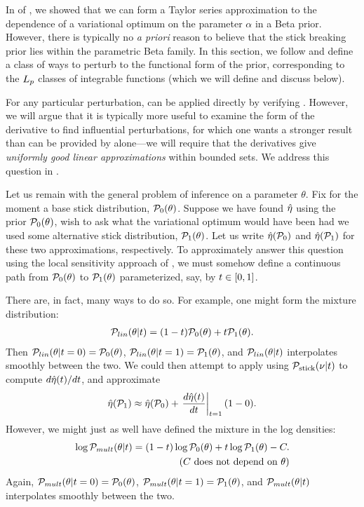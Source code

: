 In  of , we showed that
we can form a Taylor series approximation to the dependence of a variational
optimum on the parameter $\alpha$ in a Beta prior. However, there is typically
no {\em a priori} reason to believe that the stick breaking prior lies within
the parametric Beta family.  In this section, we follow
\citet{gustafson:1996:local} and define a class of ways to perturb to the
functional form of the prior, corresponding to the ${L_{p}}$ classes of
integrable functions (which we will define and discuss below).

For any particular perturbation,  can be applied directly by
verifying .  However, we will argue that it is
typically more useful to examine the form of the derivative to find influential
perturbations, for which one wants a stronger result than can be provided
by  alone---we will require that the derivatives give
{\em uniformly good linear approximations} within bounded sets.
We address this question in .

Let us remain with the general problem of inference on a parameter $\theta$.
Fix for the moment a base stick distribution, $\mathcal{P}_{0}(\theta)$.  Suppose we have
found $\hat\eta$ using the prior $\mathcal{P}_{0}(\theta)$, wish to ask what the variational
optimum would have been had we used some alternative stick distribution,
$\mathcal{P}_{1}(\theta)$.  Let us write $\hat\eta(\mathcal{P}_{0})$ and $\hat\eta(\mathcal{P}_{1})$ for these
two approximations, respectively.  To approximately answer this question using
the local sensitivity approach of , we must somehow
define a continuous path from $\mathcal{P}_{0}(\theta)$ to $\mathcal{P}_{1}(\theta)$ parameterized,
say, by $t \in [0, 1]$.

There are, in fact, many ways to do so.  For example, one might form the mixture
distribution:
%
\begin{align*}
%
\p_{lin}(\theta \vert \t) =
    (1- \t) \pbase(\theta) + \t \palt(\theta).
%
\end{align*}
%
Then $\mathcal{P}_{lin}(\theta \vert t=0) = \mathcal{P}_{0}(\theta)$, $\mathcal{P}_{lin}(\theta \vert t=1) =
\mathcal{P}_{1}(\theta)$, and $\mathcal{P}_{lin}(\theta \vert t)$ interpolates smoothly between the
two.  We could then attempt to apply  using $\mathcal{P}_{\mathrm{stick}}(\nu \vert
t)$ to compute $d\hat\eta(t) / dt$, and approximate
%
\begin{align*}
%
\etaopt(\palt) \approx \etaopt(\pbase) + \fracat{d \etaopt(\t)}{d\t}{\t=1}(1 - 0).
%
\end{align*}
%
However, we might just as well have defined the mixture in the log densities:
%
\begin{align*}
%
\log \p_{mult}(\theta \vert \t) =
    (1- \t) \log\pbase(\theta) + \t \log\palt(\theta) -
    \const. \\ \constdesc{\theta}
%
\end{align*}
%
Again, $\mathcal{P}_{mult}(\theta \vert t=0) = \mathcal{P}_{0}(\theta)$, $\mathcal{P}_{mult}(\theta \vert
t=1) = \mathcal{P}_{1}(\theta)$, and $\mathcal{P}_{mult}(\theta \vert t)$ interpolates smoothly
between the two.

